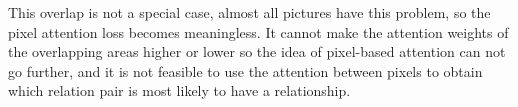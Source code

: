 This  overlap is not a special case, almost all pictures have this problem, so the pixel attention loss becomes meaningless. It cannot make the attention weights of the overlapping areas higher or lower so the idea of pixel-based attention can not go further, and it is not feasible to use the attention between pixels to obtain which relation pair is most likely to have a relationship.

%
%
%

